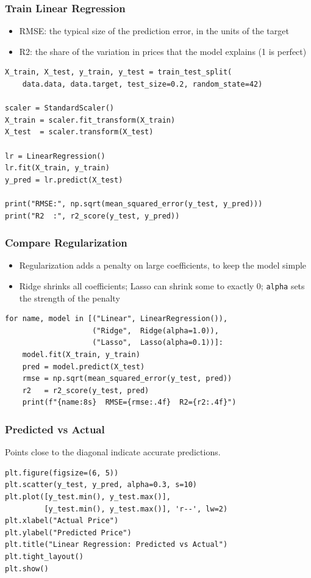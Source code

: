 \begin{frame}[fragile]\frametitle{Train Linear Regression}
\begin{itemize}
\item RMSE: the typical size of the prediction error, in the units of the target
\item R2: the share of the variation in prices that the model explains (1 is perfect)
\end{itemize}
\begin{lstlisting}
X_train, X_test, y_train, y_test = train_test_split(
    data.data, data.target, test_size=0.2, random_state=42)

scaler = StandardScaler()
X_train = scaler.fit_transform(X_train)
X_test  = scaler.transform(X_test)

lr = LinearRegression()
lr.fit(X_train, y_train)
y_pred = lr.predict(X_test)

print("RMSE:", np.sqrt(mean_squared_error(y_test, y_pred)))
print("R2  :", r2_score(y_test, y_pred))
\end{lstlisting}
\end{frame}

\begin{frame}[fragile]\frametitle{Compare Regularization}
\begin{itemize}
\item Regularization adds a penalty on large coefficients, to keep the model simple
\item Ridge shrinks all coefficients; Lasso can shrink some to exactly 0; \texttt{alpha} sets the strength of the penalty
\end{itemize}
\begin{lstlisting}
for name, model in [("Linear", LinearRegression()),
                    ("Ridge",  Ridge(alpha=1.0)),
                    ("Lasso",  Lasso(alpha=0.1))]:
    model.fit(X_train, y_train)
    pred = model.predict(X_test)
    rmse = np.sqrt(mean_squared_error(y_test, pred))
    r2   = r2_score(y_test, pred)
    print(f"{name:8s}  RMSE={rmse:.4f}  R2={r2:.4f}")
\end{lstlisting}
\end{frame}

\begin{frame}[fragile]\frametitle{Predicted vs Actual}
Points close to the diagonal indicate accurate predictions.
\begin{lstlisting}
plt.figure(figsize=(6, 5))
plt.scatter(y_test, y_pred, alpha=0.3, s=10)
plt.plot([y_test.min(), y_test.max()],
         [y_test.min(), y_test.max()], 'r--', lw=2)
plt.xlabel("Actual Price")
plt.ylabel("Predicted Price")
plt.title("Linear Regression: Predicted vs Actual")
plt.tight_layout()
plt.show()
\end{lstlisting}
\end{frame}

